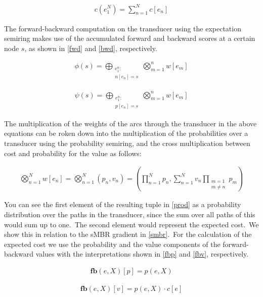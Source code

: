 \documentclass[a4paper,13.5pt]{extarticle}
\begin{document}
	\begin{align}
		\label{addcost}
		c(e_1^N) = \sum_{n=1}^N c[e_n]
	\end{align}
	
	The forward-backward computation on the transducer using the expectation semiring makes use of the accumulated forward and backward scores at a certain node $s$, as shown in \cref{fwd} and \cref{bwd}, respectively. 
	
	
	\begin{align}
		\label{fwd}
		\phi(s)= \bigoplus_{\substack{e_1^n: \\ n[e_n]=s}} \bigotimes_{m=1}^n w[e_m]
	\end{align}
	
	
	\begin{align}
		\label{bwd}
		\psi(s)= \bigoplus_{\substack{e_1^n: \\ p[e_n]=s}} \bigotimes_{m=1}^n w[e_m]
	\end{align}
	
	The multiplication of the weights of the arcs through the transducer in the above equations can be roken down into the multiplication of the probabilities over a transducer using the probability semiring, and the cross multiplication between cost and probability for the value as follows:
	
	
	
	\begin{align}
		\label{prod}
		\bigotimes_{n=1}^N w[e_n] =  \bigotimes_{n=1}^N (p_n, v_n) = \left(\prod_{n=1}^N p_n,  \sum_{n=1}^N v_n \prod_{\substack{m=1 \\ m \neq n}} p_m\right)
	\end{align}
	
	You can see the first element of the resulting tuple in \cref{prod} as a probability distribution over the paths in the transducer, since the sum over all paths of this would sum up to one.\ The second element would represent the expected cost.\ We show this in relation to the sMBR gradient in \cref{smbr}.\ For the calculation of the expected cost we use the probability and the value components of the forward-backward values with the interpretations shown in \cref{fbp} and \cref{fbv}, respectively.
	
	\begin{align}
		\label{fbp}
		\mathbf{fb}(e, X)[p] = p(e, X)
	\end{align}
	
	\begin{align}
		\label{fbv}
		\mathbf{fb}(e, X)[v] = p(e, X)\cdot c[e]
	\end{align}
	
\end{document}
